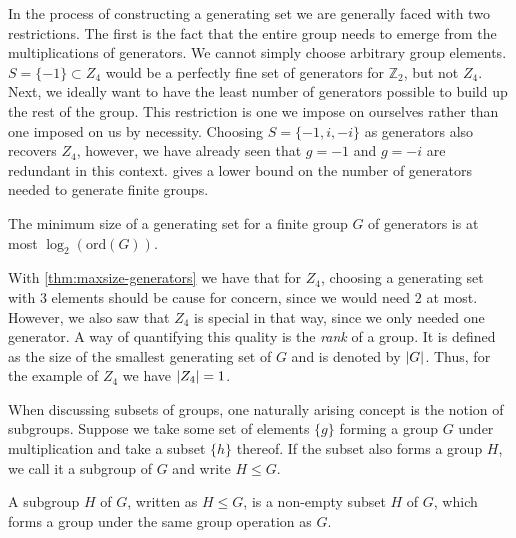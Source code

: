 In the process of constructing a generating set we are generally faced with two
restrictions. The first is the fact that the entire group needs to emerge from
the multiplications of generators. We cannot simply choose arbitrary group
elements. $S=\{-1\}\subset Z_4$ would be a perfectly fine set of generators for
$\mathbb{Z}_2$, but not $Z_4$. Next, we ideally want to have the least number
of generators possible to build up the rest of the group. This restriction is
one we impose on ourselves rather than one imposed on us by necessity. Choosing
$S=\{-1, i, -i\}$ as generators also recovers $Z_4$, however, we have already
seen that $g=-1$ and $g=-i$ are redundant in this context.
 gives a lower bound on the number of generators
needed to generate finite groups.

\begin{thm}\label{thm:maxsize-generators} 
  The minimum size of a generating set for a finite group $G$ of generators is
  at most $\log_2(\mathrm{ord}(G))$.
\end{thm}

%

With \cref{thm:maxsize-generators} we have that for $Z_4$, choosing a
generating set with $3$ elements should be cause for concern, since we would
need $2$ at most. However, we also saw that $Z_4$ is special in that way, since
we only needed one generator. A way of quantifying this quality is the
\emph{rank} of a group.  It is defined as the size of the smallest generating
set of $G$ and is denoted by $\abs{G}$. Thus, for the example of $Z_4$ we have
$\abs{Z_4}=1$. 

When discussing subsets of groups, one naturally arising concept is the notion
of subgroups. Suppose we take some set of elements $\{g\}$ forming a group $G$
under multiplication and take a subset $\{h\}$ thereof. If the subset also
forms a group $H$, we call it a subgroup of $G$ and write $H \leq G$.

\begin{defn}\label{defn:subgroup}
  A subgroup $H$ of $G$, written as $H \leq G$, is a non-empty subset $H$ of $G$, which forms
  a group under the same group operation as $G$. 
\end{defn}

